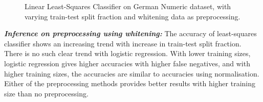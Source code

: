 \documentclass[12pt, a4 paper]{article}
\begin{document}
\begin{figure}

\caption{Linear Least-Squares Classifier on German Numeric dataset, with varying train-test split fraction and whitening data as preprocessing.}
\label{fig:german_whiten}
\end{figure}

{\it \bfseries Inference on preprocessing using whitening:} The accuracy of least-squares classifier shows an increasing trend with increase in train-test split fraction. There is no such clear trend with logistic regression. With lower training sizes, logistic regression gives higher accuracies with higher false negatives, and with higher training sizes, the accuracies are similar to accuracies using normalisation. Either of the preprocessing methods provides better results with higher training size than no preprocessing.
\end{document}
